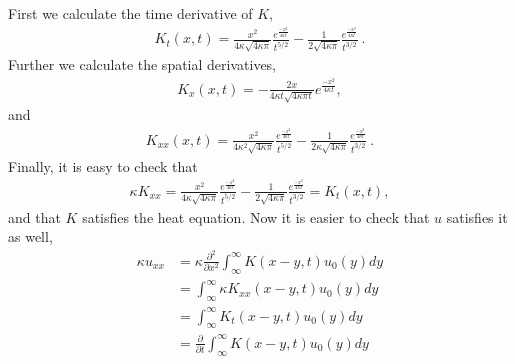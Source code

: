 \begin{questions}

\begin{solution}
First we calculate the time derivative of $K$,
\begin{align*}
K_t(x,t)=\frac{x^2}{4\kappa\sqrt{4\kappa\pi}}\frac{e^{\frac{-x^2}{4\kappa t}}}{t^{5/2}}-\frac{1}{2\sqrt{4\kappa\pi}}\frac{e^{\frac{-x^2}{4\kappa t}}}{t^{3/2}}~.
\end{align*}
Further we calculate the spatial derivatives,
\begin{align*}
K_x(x,t)=-\frac{2x}{4\kappa t\sqrt{4\kappa\pi t}}e^{\frac{-x^2}{4\kappa t}},
\end{align*}
and
\begin{align*}
K_{xx}(x,t)=\frac{x^2}{4\kappa^2\sqrt{4\kappa\pi}}\frac{e^{\frac{-x^2}{4\kappa t}}}{t^{5/2}}-\frac{1}{2\kappa\sqrt{4\kappa\pi}}\frac{e^{\frac{-x^2}{4\kappa t}}}{t^{3/2}}~.
\end{align*}
Finally, it is easy to check that
\begin{align*}
\kappa K_{xx}=\frac{x^2}{4\kappa\sqrt{4\kappa\pi}}\frac{e^{\frac{-x^2}{4\kappa t}}}{t^{5/2}}-\frac{1}{2\sqrt{4\kappa\pi}}\frac{e^{\frac{-x^2}{4\kappa t}}}{t^{3/2}}=K_t(x,t),
\end{align*}
and that $K$ satisfies the heat equation.
Now it is easier to check that $u$ satisfies it as well,
\begin{align*}
\kappa u_{xx}&=\kappa\frac{\partial^2}{\partial x^2}\int_\infty^{\infty}K(x -y, t) u_0(y) dy\\
&=\int_\infty^{\infty}\kappa K_{xx}(x -y, t) u_0(y) dy\\
&=\int_\infty^{\infty} K_{t}(x -y, t) u_0(y) dy\\
&=\frac{\partial}{\partial t}\int_\infty^{\infty}K(x -y, t) u_0(y) dy\\

\end{align*}
\end{solution}
\end{questions}
